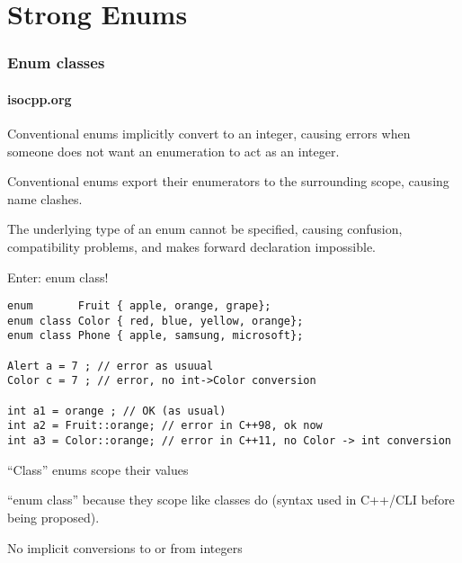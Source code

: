 \section{Strong Enums}

\begin{frame}[fragile]
\frametitle{Enum classes}
\framesubtitle{isocpp.org}
\begin{itemize}
{\scriptsize
\item Conventional enums implicitly convert to an integer, causing errors when someone does not want an enumeration to act as an integer.
\pause{}
\item Conventional enums export their enumerators to the surrounding scope, causing name clashes.
\pause{}
\item The underlying type of an enum cannot be specified, causing confusion, compatibility problems, and makes forward declaration impossible.
\pause{}
\item Enter: enum class!
\begin{verbatim}
enum       Fruit { apple, orange, grape};
enum class Color { red, blue, yellow, orange};
enum class Phone { apple, samsung, microsoft};

Alert a = 7 ; // error as usuual
Color c = 7 ; // error, no int->Color conversion

int a1 = orange ; // OK (as usual)
int a2 = Fruit::orange; // error in C++98, ok now
int a3 = Color::orange; // error in C++11, no Color -> int conversion

\end{verbatim}

\item ``Class'' enums scope their values
\item ``enum class'' because they scope like classes do
  (syntax used in C++/CLI before being proposed).
\item No implicit conversions to or from integers
}

\end{itemize}
\end{frame}


